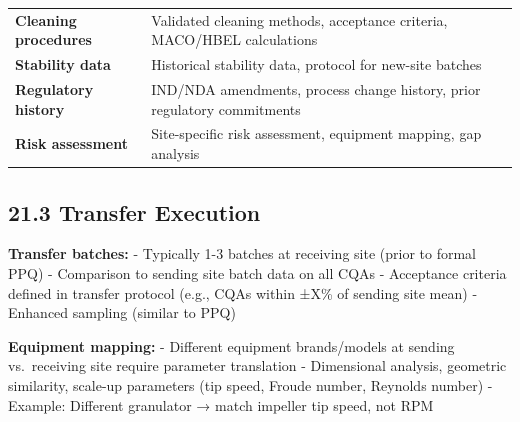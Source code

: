 \documentclass[
  11pt,
  a4paper,
]{report}
\begin{document}
\begin{longtable}[]{@{}ll@{}}
\begin{minipage}[t]{0.49\columnwidth}
\textbf{Cleaning procedures}\strut
\end{minipage} & \begin{minipage}[t]{0.45\columnwidth}\raggedright
Validated cleaning methods, acceptance criteria, MACO/HBEL
calculations\strut
\end{minipage}\tabularnewline
\begin{minipage}[t]{0.49\columnwidth}\raggedright
\textbf{Stability data}\strut
\end{minipage} & \begin{minipage}[t]{0.45\columnwidth}\raggedright
Historical stability data, protocol for new-site batches\strut
\end{minipage}\tabularnewline
\begin{minipage}[t]{0.49\columnwidth}\raggedright
\textbf{Regulatory history}\strut
\end{minipage} & \begin{minipage}[t]{0.45\columnwidth}\raggedright
IND/NDA amendments, process change history, prior regulatory
commitments\strut
\end{minipage}\tabularnewline
\begin{minipage}[t]{0.49\columnwidth}\raggedright
\textbf{Risk assessment}\strut
\end{minipage} & \begin{minipage}[t]{0.45\columnwidth}\raggedright
Site-specific risk assessment, equipment mapping, gap analysis\strut
\end{minipage}\tabularnewline
\bottomrule
\end{longtable}

\hypertarget{transfer-execution}{%
\subsection{21.3 Transfer Execution}\label{transfer-execution}}

\textbf{Transfer batches:} - Typically 1-3 batches at receiving site
(prior to formal PPQ) - Comparison to sending site batch data on all
CQAs - Acceptance criteria defined in transfer protocol (e.g., CQAs
within ±X\% of sending site mean) - Enhanced sampling (similar to PPQ)

\textbf{Equipment mapping:} - Different equipment brands/models at
sending vs.~receiving site require parameter translation - Dimensional
analysis, geometric similarity, scale-up parameters (tip speed, Froude
number, Reynolds number) - Example: Different granulator → match
impeller tip speed, not RPM
\end{document}
